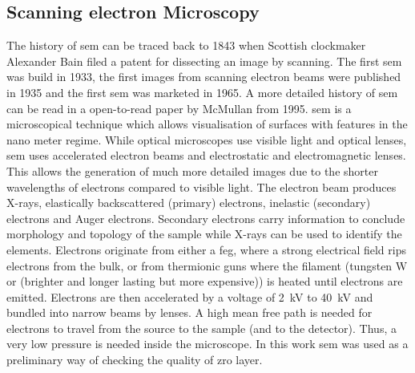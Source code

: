 \subsection{Scanning electron Microscopy}
The history of \gls{sem} can be traced back to 1843 when Scottish clockmaker Alexander Bain filed a patent for dissecting an image by scanning. 
The first \gls{sem} was build in 1933, 
the first images from scanning electron beams were published in 1935
and the first \gls{sem} was marketed in 1965.
A more detailed history of \gls{sem} can be read in a open-to-read paper by McMullan from 1995\cite{McMullan1995}. 
\Gls{sem} is a microscopical technique which allows visualisation of surfaces with features in the nano meter regime. 
While optical microscopes use visible light and optical lenses, \gls{sem} uses accelerated electron beams and electrostatic and electromagnetic lenses.
This allows the generation of much more detailed images due to the shorter wavelengths of electrons compared to visible light\cite{Kaliva2020}.
The electron beam produces X-rays, elastically backscattered (primary) electrons, inelastic (secondary) electrons and Auger electrons. 
Secondary electrons carry information to conclude morphology and topology of the sample while X-rays can be used to identify the elements. 
Electrons originate from either a \gls{feg}, where a strong electrical field rips electrons from the bulk, or from thermionic guns where the filament (tungsten W or  (brighter and longer lasting but more expensive)) is heated until electrons are emitted. 
Electrons are then accelerated by a voltage of \SI{2}{\kilo\volt} to \SI{40}{\kilo\volt} and bundled into narrow beams by lenses\cite{Vernon2000}.
A high mean free path is needed for electrons to travel from the source to the sample (and to the detector). 
Thus, a very low pressure is needed inside the microscope. 
In this work \gls{sem} was used as a preliminary way of checking the quality of \gls{zro} layer. 
\enlargethispage{\baselineskip}


